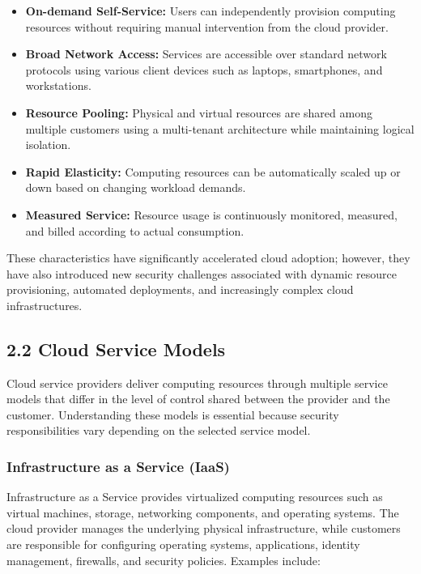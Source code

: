 \begin{itemize}
\tightlist
\item
  \textbf{On-demand Self-Service:} Users can independently provision computing resources without requiring manual intervention from the cloud provider.\\
\item
  \textbf{Broad Network Access:} Services are accessible over standard network protocols using various client devices such as laptops, smartphones, and workstations.\\
\item
  \textbf{Resource Pooling:} Physical and virtual resources are shared among multiple customers using a multi-tenant architecture while maintaining logical isolation.\\
\item
  \textbf{Rapid Elasticity:} Computing resources can be automatically scaled up or down based on changing workload demands.\\
\item
  \textbf{Measured Service:} Resource usage is continuously monitored, measured, and billed according to actual consumption.
\end{itemize}

These characteristics have significantly accelerated cloud adoption; however, they have also introduced new security challenges associated with dynamic resource provisioning, automated deployments, and increasingly complex cloud infrastructures.

\subsection{2.2 Cloud Service Models}

Cloud service providers deliver computing resources through multiple service models that differ in the level of control shared between the provider and the customer. Understanding these models is essential because security responsibilities vary depending on the selected service model.

\subsubsection{Infrastructure as a Service (IaaS)}

Infrastructure as a Service provides virtualized computing resources such as virtual machines, storage, networking components, and operating systems. The cloud provider manages the underlying physical infrastructure, while customers are responsible for configuring operating systems, applications, identity management, firewalls, and security policies. Examples include:

